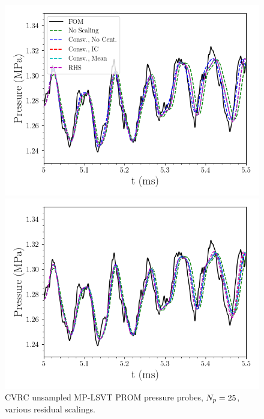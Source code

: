\begin{figure}
	\begin{minipage}{0.49\linewidth}
		\includegraphics[width=0.99\linewidth]{Chapters/BestPractices/Images/pressure_probe_scale_l2.png}
	\end{minipage}
	\begin{minipage}{0.49\linewidth}
		\includegraphics[width=0.99\linewidth]{Chapters/BestPractices/Images/pressure_probe_scale_minmax.png}
	\end{minipage}
	\caption{\label{fig:resProbes}CVRC unsampled MP-LSVT PROM pressure probes, $N_p = 25$, various residual scalings.}
\end{figure}

